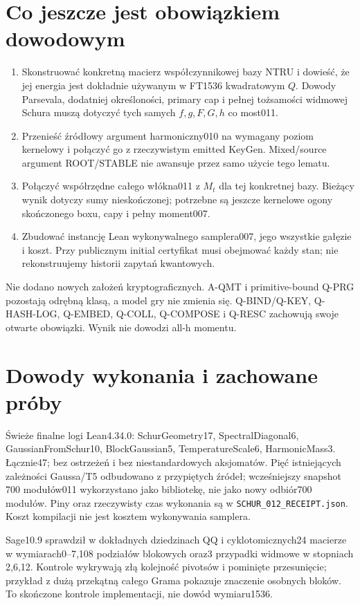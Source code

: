 \documentclass[11pt,a4paper]{article}
\newcommand{\code}[1]{\nolinkurl{#1}}
\begin{document}
\section{Co jeszcze jest obowiązkiem dowodowym}
\begin{enumerate}
\item Skonstruować konkretną macierz współczynnikowej bazy NTRU i dowieść,
że jej energia jest dokładnie używanym w FT1536 kwadratowym $Q$.
Dowody Parsevala, dodatniej określoności, primary cap i pełnej tożsamości
widmowej Schura muszą dotyczyć tych samych $f,g,F,G,h$ co most011.
\item Przenieść źródłowy argument harmoniczny010 na wymagany poziom
kernelowy i połączyć go z rzeczywistym emitted KeyGen. Mixed/source
argument ROOT/STABLE nie awansuje przez samo użycie tego lematu.
\item Połączyć współrzędne całego włókna011 z $M_t$ dla tej konkretnej
bazy. Bieżący wynik dotyczy sumy nieskończonej; potrzebne są jeszcze
kernelowe ogony skończonego boxu, capy i pełny moment007.
\item Zbudować instancję Lean wykonywalnego samplera007, jego wszystkie
gałęzie i koszt. Przy publicznym initial certyfikat musi obejmować każdy
stan; nie rekonstruujemy historii zapytań kwantowych.
\end{enumerate}
Nie dodano nowych założeń kryptograficznych. A-QMT i primitive-bound
Q-PRG pozostają odrębną klasą, a model gry nie zmienia się.
Q-BIND/Q-KEY, Q-HASH-LOG, Q-EMBED, Q-COLL, Q-COMPOSE i Q-RESC
zachowują swoje otwarte obowiązki. Wynik nie dowodzi all-h momentu.

\section{Dowody wykonania i zachowane próby}
Świeże finalne logi Lean4.34.0: SchurGeometry17, SpectralDiagonal6,
GaussianFromSchur10, BlockGaussian5, TemperatureScale6, HarmonicMass3.
Łącznie47; bez ostrzeżeń i bez niestandardowych aksjomatów. Pięć istniejących
zależności Gaussa/T5 odbudowano z przypiętych źródeł; wcześniejszy snapshot
700 modułów011 wykorzystano jako bibliotekę, nie jako nowy odbiór700 modułów.
Piny oraz rzeczywisty czas wykonania są w \code{SCHUR_012_RECEIPT.json}.
Koszt kompilacji nie jest kosztem wykonywania samplera.

Sage10.9 sprawdził w dokładnych dziedzinach QQ i cyklotomicznych24 macierze
w wymiarach0--7,108 podziałów blokowych oraz3 przypadki widmowe w stopniach
2,6,12. Kontrole wykrywają złą kolejność pivotsów i pominięte przesunięcie;
przykład z dużą przekątną całego Grama pokazuje znaczenie osobnych bloków.
To skończone kontrole implementacji, nie dowód wymiaru1536.
\end{document}
